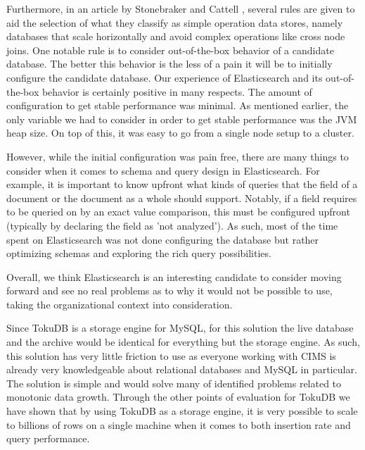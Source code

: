 Furthermore, in an article by Stonebraker and Cattell \cite{10rules}, several rules are given to aid the selection of what they classify as simple operation data stores, namely databases that scale horizontally and avoid complex operations like cross node joins. One notable rule is to consider out-of-the-box behavior of a candidate database. The better this behavior is the less of a pain it will be to initially configure the candidate database. Our experience of Elasticsearch and its out-of-the-box behavior is certainly positive in many respects. The amount of configuration to get stable performance was minimal. As mentioned earlier, the only variable we had to consider in order to get stable performance was the JVM heap size. On top of this, it was easy to go from a single node setup to a cluster. 

However, while the initial configuration was pain free, there are many things to consider when it comes to schema and query design in Elasticsearch. For example, it is important to know upfront what kinds of queries that the field of a document or the document as a whole should support. Notably, if a field requires to be queried on by an exact value comparison, this must be configured upfront (typically by declaring the field as 'not analyzed'). As such, most of the time spent on Elasticsearch was not done configuring the database but rather optimizing schemas and exploring the rich query possibilities.

Overall, we think Elasticsearch is an interesting candidate to consider moving forward and see no real problems as to why it would not be possible to use, taking the organizational context into consideration.

Since TokuDB is a storage engine for MySQL, for this solution the live database and the archive would be identical for everything but the storage engine. As such, this solution has very little friction to use as everyone working with CIMS is already very knowledgeable about relational databases and MySQL in particular. The solution is simple and would solve many of identified problems related to monotonic data growth. Through the other points of evaluation for TokuDB we have shown that by using TokuDB as a storage engine, it is very possible to scale to billions of rows on a single machine when it comes to both insertion rate and query performance.